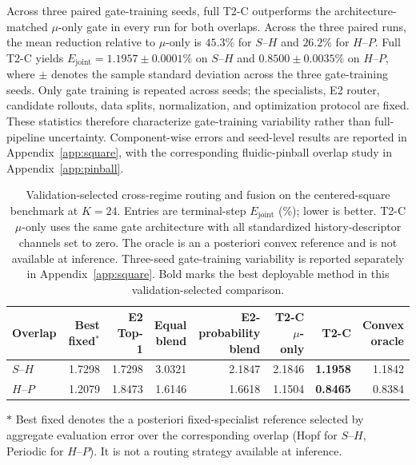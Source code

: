\documentclass{article}
\begin{document}
Across three paired gate-training seeds, full T2-C outperforms the architecture-matched $\mu$-only gate in every run for both overlaps.
Across the three paired runs, the mean reduction relative to $\mu$-only is $45.3\%$ for $S$--$H$ and $26.2\%$ for $H$--$P$. Full T2-C yields
$E_{\mathrm{joint}}=1.1957\pm0.0001\%$ on $S$--$H$ and $0.8500\pm0.0035\%$ on $H$--$P$, where $\pm$ denotes the sample standard
deviation across the three gate-training seeds. Only gate training is repeated across seeds; the specialists, E2 router, candidate rollouts, data splits, normalization, and optimization protocol are fixed. These statistics therefore characterize gate-training variability rather than full-pipeline uncertainty. Component-wise errors and seed-level results are reported in Appendix~\ref{app:square}, with the corresponding fluidic-pinball overlap study in Appendix~\ref{app:pinball}.


\par
\begin{table}[H]
\centering
\caption{
Validation-selected cross-regime routing and fusion on the centered-square benchmark at $K=24$. Entries are terminal-step $E_{\mathrm{joint}}$ (\%); lower is better. T2-C $\mu$-only uses the same gate architecture with all standardized history-descriptor channels set to zero. The oracle is an a posteriori convex reference and is not available at inference. Three-seed gate-training variability is reported separately in
Appendix~\ref{app:square}. Bold marks the best deployable method in this validation-selected comparison.
}
\label{tab:routing_fusion}
\small
\setlength{\tabcolsep}{3.5pt}
\begin{threeparttable}
\begin{tabular}{@{}lrrrrrrr@{}}
\toprule
Overlap & Best fixed$^\ast$ & E2 Top-1 & \shortstack{Equal\\blend} & \shortstack{E2-probability\\blend} & \shortstack{T2-C\\$\mu$-only} & T2-C & \shortstack{Convex\\oracle}\\
\midrule
$S$--$H$ & 1.7298 & 1.7298 & 3.0321 & 2.1847 & 2.1846 & \textbf{1.1958} & 1.1842 \\
$H$--$P$ & 1.2079 & 1.8473 & 1.6146 & 1.6618 & 1.1504 & \textbf{0.8465} & 0.8384 \\
\bottomrule
\end{tabular}
\begin{tablenotes}[flushleft]
\footnotesize
\item[$\ast$] Best fixed denotes the a posteriori fixed-specialist reference selected by aggregate evaluation error over the corresponding overlap (Hopf for $S$--$H$, Periodic for $H$--$P$). It is not a routing strategy available at inference.
\end{tablenotes}
\end{threeparttable}
\end{table}
\par
\end{document}

